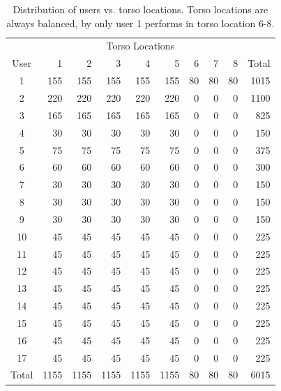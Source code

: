 \begin{table}[tbp]
	\centering
	\begin{tabular}{@{}crrrrrrrrr@{}}
		\toprule
		& \multicolumn{8}{c}{Torso Locations}             & \multicolumn{1}{l}{} \\ 
		User  & 1    & 2    & 3    & 4    & 5    & 6  & 7  & 8  & Total                \\ \midrule
		1     & 155  & 155  & 155  & 155  & 155  & 80 & 80 & 80 & 1015                 \\
		2     & 220  & 220  & 220  & 220  & 220  & 0  & 0  & 0  & 1100                 \\
		3     & 165  & 165  & 165  & 165  & 165  & 0  & 0  & 0  & 825                  \\
		4     & 30   & 30   & 30   & 30   & 30   & 0  & 0  & 0  & 150                  \\
		5     & 75   & 75   & 75   & 75   & 75   & 0  & 0  & 0  & 375                  \\
		6     & 60   & 60   & 60   & 60   & 60   & 0  & 0  & 0  & 300                  \\
		7     & 30   & 30   & 30   & 30   & 30   & 0  & 0  & 0  & 150                  \\
		8     & 30   & 30   & 30   & 30   & 30   & 0  & 0  & 0  & 150                  \\
		9     & 30   & 30   & 30   & 30   & 30   & 0  & 0  & 0  & 150                  \\
		10    & 45   & 45   & 45   & 45   & 45   & 0  & 0  & 0  & 225                  \\
		11    & 45   & 45   & 45   & 45   & 45   & 0  & 0  & 0  & 225                  \\
		12    & 45   & 45   & 45   & 45   & 45   & 0  & 0  & 0  & 225                  \\
		13    & 45   & 45   & 45   & 45   & 45   & 0  & 0  & 0  & 225                  \\
		14    & 45   & 45   & 45   & 45   & 45   & 0  & 0  & 0  & 225                  \\
		15    & 45   & 45   & 45   & 45   & 45   & 0  & 0  & 0  & 225                  \\
		16    & 45   & 45   & 45   & 45   & 45   & 0  & 0  & 0  & 225                  \\
		17    & 45   & 45   & 45   & 45   & 45   & 0  & 0  & 0  & 225                  \\ \midrule
		Total & 1155 & 1155 & 1155 & 1155 & 1155 & 80 & 80 & 80 & 6015                 \\ \bottomrule
	\end{tabular}
	\caption{Distribution of users vs. torso locations. Torso locations are always balanced, by only user 1 performs in torso location 6-8.}
	\label{tab:dist-torso-user}
\end{table}

